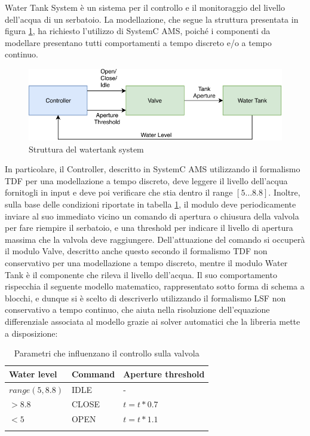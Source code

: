 \documentclass[]{IEEEtran}
\begin{document}
Water Tank System è un sistema per il controllo e il monitoraggio del livello dell'acqua di un serbatoio. La modellazione,
che segue la struttura presentata in figura \ref{fig:continuous_system}, ha richiesto l'utilizzo di SystemC AMS, poich\'e 
i componenti da modellare presentano tutti comportamenti a tempo discreto e/o a tempo continuo.
\begin{figure}[bt]
	\centering
	\includegraphics[width=\columnwidth]{figures/countinous_system.pdf}
	\caption{Struttura del watertank system}
	\label{fig:continuous_system}
\end{figure}
In particolare, il Controller, descritto in SystemC AMS utilizzando il formalismo TDF per una modellazione a tempo discreto, 
deve leggere il livello dell'acqua fornitogli in input e deve poi verificare che stia dentro il range $[5 \dots 8.8]$. 
Inoltre, sulla base delle condizioni riportate in tabella \ref{tab:behaviour}, il modulo deve periodicamente inviare al 
suo immediato vicino un comando di apertura o chiusura della valvola per fare riempire il serbatoio, e una threshold per 
indicare il livello di apertura massima che la valvola deve raggiungere. Dell'attuazione del comando si occuper\`a il 
modulo Valve, descritto anche questo secondo il formalismo TDF non conservativo per una modellazione a tempo discreto, 
mentre il modulo Water Tank è il componente che rileva il livello dell'acqua. Il suo comportamento rispecchia il seguente 
modello matematico, rappresentato sotto forma di schema a blocchi, e dunque si è scelto di descriverlo utilizzando 
il formalismo LSF non conservativo a tempo continuo, che aiuta nella risoluzione dell'equazione differenziale associata 
al modello grazie ai solver automatici che la libreria mette a disposizione:\\

\begin{table}[]
    \centering
    \begin{tabular}{lll}
    \toprule
    Water level     & Command   & Aperture threshold\\ \hline
    $range(5,8.8)$  & IDLE      & - \\
    $>8.8$          & CLOSE     & $t = t * 0.7$\\
    $<5$            & OPEN      & $t = t * 1.1$\\ \bottomrule
    \\
    \end{tabular}
    \caption{Parametri che influenzano il controllo sulla valvola}
    \label{tab:behaviour}
\end{table}  
\end{document}
